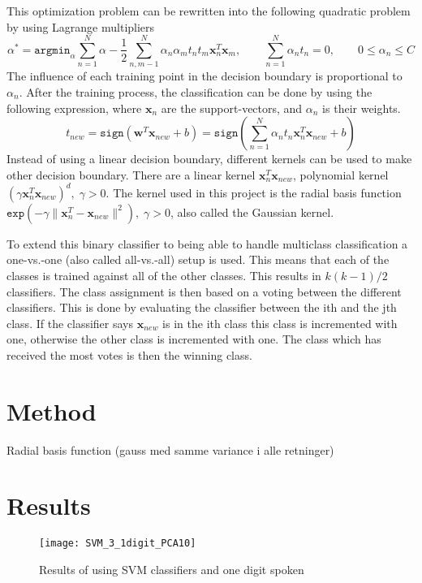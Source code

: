 This optimization problem can be rewritten into the following quadratic problem by using Lagrange multipliers
\begin{equation}
\alpha^* = 
\mathtt{argmin}_\alpha \sum_{n=1}^{N}\alpha - \frac{1}{2} 
\sum_{n,m-1}^{N} \alpha_n \alpha_m t_n t_m \mathbf{x}^T_n \mathbf{x}_m, 
\qquad \sum_{n=1}^{N} \alpha_n t_n = 0, \qquad
0\leq \alpha_n \leq C 
\end{equation}
The influence of each training point in the decision boundary is proportional to $ \alpha_n $.
After the training process, the classification can be done by using the following expression, where $ \mathbf{x}_n $  are the support-vectors, and $ \alpha_n $ is their weights.
\begin{equation}
t_{new} = 
\mathtt{sign}(\mathbf{w}^T \mathbf{x}_{new} +b) =
\mathtt{sign}\left( \sum_{n=1}^{N} \alpha_n t_n \mathbf{x}^T_n \mathbf{x}_{new} +b  \right) 
\end{equation} 
Instead of using a linear decision boundary, different kernels can be used to make other decision boundary.
There are a linear kernel $ \mathbf{x}^T_n \mathbf{x}_{new} $, polynomial kernel $ (\gamma \mathbf{x}^T_n \mathbf{x}_{new} )^d,\; \gamma > 0 $.
The kernel used in this project is the radial basis function $ \mathtt{exp}(-\gamma \|\mathbf{x}^T_n - \mathbf{x}_{new} \|^2 ), \; \gamma > 0 $, also called the Gaussian kernel.

To extend this binary classifier to being able to handle multiclass classification a one-vs.-one  (also called all-vs.-all) setup is used. 
This means that each of the classes is trained against all of the other classes. This results in $ k(k-1)/2 $ classifiers. 
The class assignment is then based on a voting between the different classifiers. 
This is done by evaluating the classifier between the ith and the jth class.
If the classifier says $ \mathbf{x}_{new} $ is in the ith class this class is incremented with one, otherwise the other class is incremented with one.
The class which has received the most votes is then the winning class.
 
\section{Method}
Radial basis function (gauss med samme variance i alle retninger) 
\section{Results}

\begin{figure}[H]
\centering
\texttt{[image: SVM\_3\_1digit\_PCA10]}
\caption{Results of using SVM classifiers and one digit spoken}
\label{fig:SVM3_1dig_PCA}
\end{figure}

